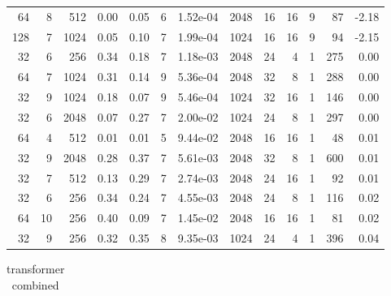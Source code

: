 \begin{appendices}
\begin{table}
\begin{tabular}{rrrrrrrrrrrrr}
64 & 8 & 512 & 0.00 & 0.05 & 6 & 1.52e-04 & 2048 & 16 & 16 & 9 & 87 & -2.18 \\
128 & 7 & 1024 & 0.05 & 0.10 & 7 & 1.99e-04 & 1024 & 16 & 16 & 9 & 94 & -2.15 \\
\midrule
32 & 6 & 256 & 0.34 & 0.18 & 7 & 1.18e-03 & 2048 & 24 & 4 & 1 & 275 & 0.00 \\
64 & 7 & 1024 & 0.31 & 0.14 & 9 & 5.36e-04 & 2048 & 32 & 8 & 1 & 288 & 0.00 \\
32 & 9 & 1024 & 0.18 & 0.07 & 9 & 5.46e-04 & 1024 & 32 & 16 & 1 & 146 & 0.00 \\
32 & 6 & 2048 & 0.07 & 0.27 & 7 & 2.00e-02 & 1024 & 24 & 8 & 1 & 297 & 0.00 \\
64 & 4 & 512 & 0.01 & 0.01 & 5 & 9.44e-02 & 2048 & 16 & 16 & 1 & 48 & 0.01 \\
32 & 9 & 2048 & 0.28 & 0.37 & 7 & 5.61e-03 & 2048 & 32 & 8 & 1 & 600 & 0.01 \\
32 & 7 & 512 & 0.13 & 0.29 & 7 & 2.74e-03 & 2048 & 24 & 16 & 1 & 92 & 0.01 \\
32 & 6 & 256 & 0.34 & 0.24 & 7 & 4.55e-03 & 2048 & 24 & 8 & 1 & 116 & 0.02 \\
64 & 10 & 256 & 0.40 & 0.09 & 7 & 1.45e-02 & 2048 & 16 & 16 & 1 & 81 & 0.02 \\
32 & 9 & 256 & 0.32 & 0.35 & 8 & 9.35e-03 & 1024 & 24 & 4 & 1 & 396 & 0.04 \\
\bottomrule
\end{tabular}
\end{table}

\begin{table}
\caption{transformer combined}
\begin{tabular}{rrrrrrrr}
\toprule


\end{tabular}
\end{table}
\end{appendices}
